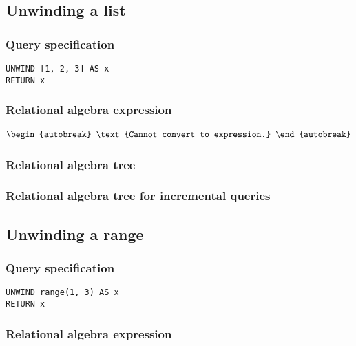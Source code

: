 \subsection{Unwinding a list}

\subsubsection*{Query specification}

\begin{lstlisting}
UNWIND [1, 2, 3] AS x
RETURN x
\end{lstlisting}

\subsubsection*{Relational algebra expression}

\begin{align*}
\begin{autobreak}
\text{Cannot convert to expression.}
\end{autobreak}
\end{align*}

\subsubsection*{Relational algebra tree}


\subsubsection*{Relational algebra tree for incremental queries}


\subsection{Unwinding a range}

\subsubsection*{Query specification}

\begin{lstlisting}
UNWIND range(1, 3) AS x
RETURN x
\end{lstlisting}

\subsubsection*{Relational algebra expression}

